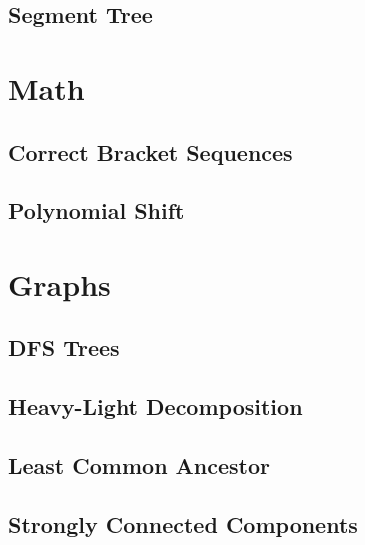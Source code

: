 \documentclass[12pt]{article}
\begin{document}
\subsection{Segment Tree} 


\section{Math}

\subsection{Correct Bracket Sequences} 
\subsection{Polynomial Shift} 


\section{Graphs}

\subsection{DFS Trees} 
\subsection{Heavy-Light Decomposition} 
\subsection{Least Common Ancestor} 
\subsection{Strongly Connected Components} 
\end{document}
